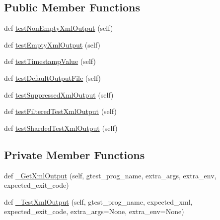 \subsection*{Public Member Functions}
\begin{DoxyCompactItemize}
\item 
def \mbox{\hyperlink{classgoogletest_1_1test_1_1gtest__xml__output__unittest_1_1_g_test_x_m_l_output_unit_test_adaaea7bbf81d60c4cb49893ed48ab247}{test\+Non\+Empty\+Xml\+Output}} (self)
\item 
def \mbox{\hyperlink{classgoogletest_1_1test_1_1gtest__xml__output__unittest_1_1_g_test_x_m_l_output_unit_test_a696c97ed55988f23218c2939f7be5c40}{test\+Empty\+Xml\+Output}} (self)
\item 
def \mbox{\hyperlink{classgoogletest_1_1test_1_1gtest__xml__output__unittest_1_1_g_test_x_m_l_output_unit_test_a26ac9db14769d1e102c2a6ad7e87c5ca}{test\+Timestamp\+Value}} (self)
\item 
def \mbox{\hyperlink{classgoogletest_1_1test_1_1gtest__xml__output__unittest_1_1_g_test_x_m_l_output_unit_test_a106abc1a0f8e69be3ed2de99b886ae3f}{test\+Default\+Output\+File}} (self)
\item 
def \mbox{\hyperlink{classgoogletest_1_1test_1_1gtest__xml__output__unittest_1_1_g_test_x_m_l_output_unit_test_a579d0ad904d16cdc3f2070e0aab67787}{test\+Suppressed\+Xml\+Output}} (self)
\item 
def \mbox{\hyperlink{classgoogletest_1_1test_1_1gtest__xml__output__unittest_1_1_g_test_x_m_l_output_unit_test_a01bfef4699d92758a1e074633b3cd4e5}{test\+Filtered\+Test\+Xml\+Output}} (self)
\item 
def \mbox{\hyperlink{classgoogletest_1_1test_1_1gtest__xml__output__unittest_1_1_g_test_x_m_l_output_unit_test_a9d04270861ee364a10f1ab7506669cf0}{test\+Sharded\+Test\+Xml\+Output}} (self)
\end{DoxyCompactItemize}
\subsection*{Private Member Functions}
\begin{DoxyCompactItemize}
\item 
def \mbox{\hyperlink{classgoogletest_1_1test_1_1gtest__xml__output__unittest_1_1_g_test_x_m_l_output_unit_test_a4d3c6300a1fd61d540bbfe64dcf81b09}{\+\_\+\+Get\+Xml\+Output}} (self, gtest\+\_\+prog\+\_\+name, extra\+\_\+args, extra\+\_\+env, expected\+\_\+exit\+\_\+code)
\item 
def \mbox{\hyperlink{classgoogletest_1_1test_1_1gtest__xml__output__unittest_1_1_g_test_x_m_l_output_unit_test_a3f48e9c8d7bac23c260faea499ff53fa}{\+\_\+\+Test\+Xml\+Output}} (self, gtest\+\_\+prog\+\_\+name, expected\+\_\+xml, expected\+\_\+exit\+\_\+code, extra\+\_\+args=None, extra\+\_\+env=None)
\end{DoxyCompactItemize}

